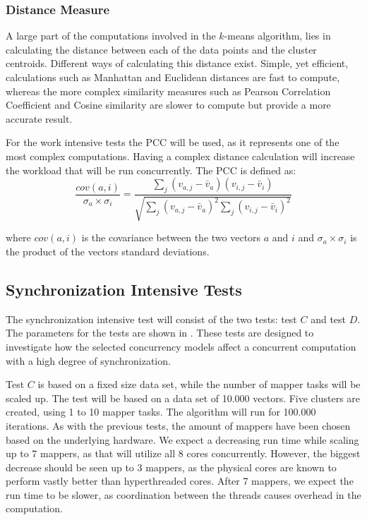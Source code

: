 \subsubsection{Distance Measure}
A large part of the computations involved in the $k$-means algorithm, lies in calculating the distance between each of the data points and the cluster centroids. Different ways of calculating this distance exist. Simple, yet efficient, calculations such as Manhattan and Euclidean\cite[p. 41]{amatriain2011data} distances are fast to compute, whereas the more complex similarity measures such as Pearson Correlation Coefficient and Cosine similarity\cite[p. 42]{amatriain2011data}\cite{breese1998empirical} are slower to compute but provide a more accurate result.

For the work intensive tests the \ac{PCC} will be used, as it represents one of the most complex computations. Having a complex distance calculation will increase the workload that will be run concurrently. The \ac{PCC} is defined as\cite[p. 4]{breese1998empirical}:
\begin{equation}\label{pearsonverbose}
\frac{cov(a,i)}{\sigma_a \times \sigma_i} = \frac{\sum_j(v_{a,j}-\bar{v}_a)(v_{i,j}-\bar{v}_i)}{\sqrt{{\sum_j}(v_{a,j}-\bar{v}_a)^2 \sum_j(v_{i,j}-\bar{v}_i)^2}}
\end{equation}

where $cov(a,i)$ is the covariance between the two vectors $a$ and $i$ and $\sigma_a \times \sigma_i$ is the product of the vectors standard deviations. 



\subsection{Synchronization Intensive Tests}
The synchronization intensive test will consist of the two tests: test $C$ and test $D$. The parameters for the tests are shown in . These tests are designed to investigate how the selected concurrency models affect a concurrent computation with a high degree of synchronization. 

Test $C$ is based on a fixed size data set, while the number of mapper tasks will be scaled up.  The test will be based on a data set of 10.000 vectors. Five clusters are created, using 1 to 10 mapper tasks. The algorithm will run for 100.000 iterations. As with the previous tests, the amount of mappers have been chosen based on the underlying hardware. We expect a decreasing run time while scaling up to 7 mappers, as that will utilize all 8 cores concurrently. However, the biggest decrease should be seen up to 3 mappers, as the physical cores are known to perform vastly better than hyperthreaded cores\cite{marr2002hyper}. After 7 mappers, we expect the run time to be slower, as coordination between the threads causes overhead in the computation.

